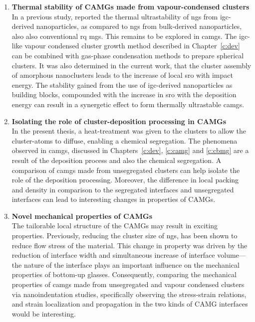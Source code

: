 \begin{enumerate}[leftmargin=*]
\item \textbf{Thermal stability of CAMGs made from vapour-condensed clusters}\\
In a previous study, \textcite{Danilov2016} reported the thermal ultrastability of \gls{ng}s from \gls{igc}-derived nanoparticles, as compared to \gls{ng}s from bulk-derived nanoparticles, also also conventional \gls{rq} \glspl{mg}. This remains to be explored in \gls{camg}s. The \gls{igc}-like vapour condensed cluster growth method described in Chapter~\ref{c:dev} can be combined with gas-phase condensation methods \cite{Krasnochtchekov2003,Zheng2020} to prepare spherical \cz clusters. It was also determined in the current work, that the cluster assembly of amorphous nanoclusters leads to the increase of local \gls{sro} with impact energy. The stability gained from the use of \gls{igc}-derived nanoparticles as building blocks, compounded with the increase in \gls{sro} with the deposition energy can result in a synergetic effect to form thermally ultrastable \gls{camg}s.

\item \textbf{Isolating the role of cluster-deposition processing in CAMGs}\\
In the present thesis, a heat-treatment was given to the clusters to allow the cluster-atoms to diffuse, enabling a chemical segregation. The phenomena observed in \gls{camg}s, discussed in Chapters~\ref{c:dev}, \ref{c:camg} and \ref{c:cbmg} are a result of the deposition process and also the chemical segregation. A comparison of \gls{camg}s made from unsegregated clusters can help isolate the role of the deposition processing. Moreover, the difference in local packing and density in comparison to the segregated interfaces and unsegregated interfaces can lead to interesting changes in properties of CAMGs.

\item \textbf{Novel mechanical properties of CAMGs} \\
The tailorable local structure of the CAMGs may result in exciting properties. Previously, reducing the cluster size of \gls{ng}s, has been shown to reduce flow stress \cite{Adibi2014,Cheng2019a} of the material. This change in property was driven by the reduction of interface width and simultaneous increase of interface volume---the nature of the interface plays an important influence on the mechanical properties of bottom-up glasses. Consequently, comparing the mechanical properties of \gls{camg}s made from unsegregated and vapour condensed clusters via nanoindentation studies, specifically observing the stress-strain relations, and strain localization and propagation in the two kinds of CAMG interfaces would be interesting.


\end{enumerate}
